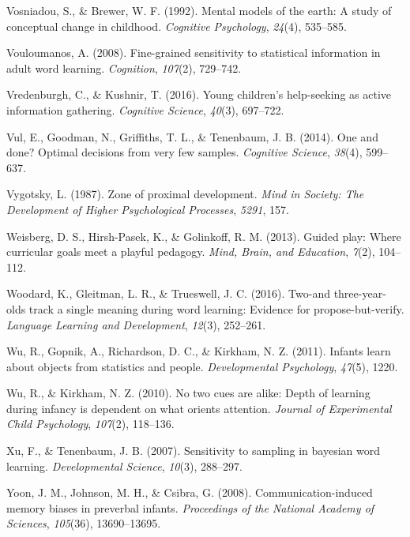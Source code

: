 \documentclass[oneside]{report}
\begin{document}
\leavevmode\hypertarget{ref-vosniadou1992mental}{}%
Vosniadou, S., \& Brewer, W. F. (1992). Mental models of the earth: A
study of conceptual change in childhood. \emph{Cognitive Psychology},
\emph{24}(4), 535--585.

\leavevmode\hypertarget{ref-vouloumanos2008fine}{}%
Vouloumanos, A. (2008). Fine-grained sensitivity to statistical
information in adult word learning. \emph{Cognition}, \emph{107}(2),
729--742.

\leavevmode\hypertarget{ref-vredenburgh2016young}{}%
Vredenburgh, C., \& Kushnir, T. (2016). Young children's help-seeking as
active information gathering. \emph{Cognitive Science}, \emph{40}(3),
697--722.

\leavevmode\hypertarget{ref-vul2014}{}%
Vul, E., Goodman, N., Griffiths, T. L., \& Tenenbaum, J. B. (2014). One
and done? Optimal decisions from very few samples. \emph{Cognitive
Science}, \emph{38}(4), 599--637.

\leavevmode\hypertarget{ref-vygotsky1987zone}{}%
Vygotsky, L. (1987). Zone of proximal development. \emph{Mind in
Society: The Development of Higher Psychological Processes},
\emph{5291}, 157.

\leavevmode\hypertarget{ref-weisberg2013guided}{}%
Weisberg, D. S., Hirsh-Pasek, K., \& Golinkoff, R. M. (2013). Guided
play: Where curricular goals meet a playful pedagogy. \emph{Mind, Brain,
and Education}, \emph{7}(2), 104--112.

\leavevmode\hypertarget{ref-woodard2016two}{}%
Woodard, K., Gleitman, L. R., \& Trueswell, J. C. (2016). Two-and
three-year-olds track a single meaning during word learning: Evidence
for propose-but-verify. \emph{Language Learning and Development},
\emph{12}(3), 252--261.

\leavevmode\hypertarget{ref-wu2011infants}{}%
Wu, R., Gopnik, A., Richardson, D. C., \& Kirkham, N. Z. (2011). Infants
learn about objects from statistics and people. \emph{Developmental
Psychology}, \emph{47}(5), 1220.

\leavevmode\hypertarget{ref-wu2010no}{}%
Wu, R., \& Kirkham, N. Z. (2010). No two cues are alike: Depth of
learning during infancy is dependent on what orients attention.
\emph{Journal of Experimental Child Psychology}, \emph{107}(2),
118--136.

\leavevmode\hypertarget{ref-xu2007sampling}{}%
Xu, F., \& Tenenbaum, J. B. (2007). Sensitivity to sampling in bayesian
word learning. \emph{Developmental Science}, \emph{10}(3), 288--297.

\leavevmode\hypertarget{ref-yoon2008communication}{}%
Yoon, J. M., Johnson, M. H., \& Csibra, G. (2008). Communication-induced
memory biases in preverbal infants. \emph{Proceedings of the National
Academy of Sciences}, \emph{105}(36), 13690--13695.
\end{document}
